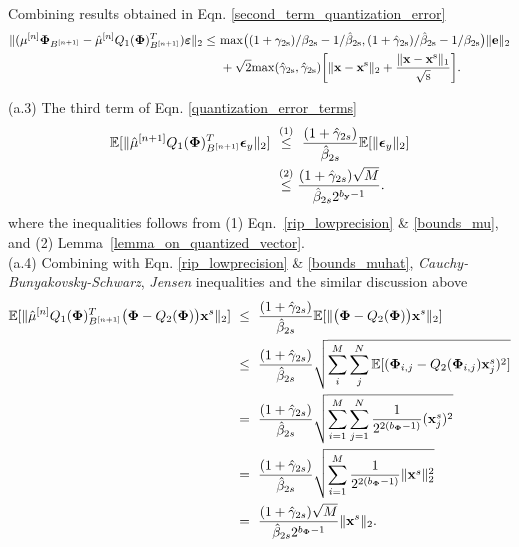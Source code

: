 \documentclass{article}
\begin{document}
Combining results obtained in Eqn. \ref{second_term_quantization_error} 
\begin{equation}\label{second_term_main_theorem}
\begin{split}
    \|(\mu^{[n]}{\bf \Phi}_{B^{[n+1]}} - \hat{\mu}^{[n]}Q_1({\bf \Phi})_{B^{[n+1]}}^T)\boldsymbol{\bf \varepsilon} \|_2 \leq & \ \rm{max}\big((1+\gamma_{2s})/\beta_{2s} - 1/\hat{\beta}_{2s}, (1+\hat{\gamma}_{2s})/\hat{\beta}_{2s} - 1/{\beta}_{2s} \big)\|{\bf e} \|_2\\
    & \ + \sqrt{2}\rm{max}(\hat{\gamma}_{2s}, \hat{\gamma}_{2s})\bigg  [ \|{\bf x}-{\bf x}^s \|_2 + \frac{\|{\bf x}-{\bf x}^s \|_1}{\sqrt{s}}\bigg].
\end{split}
\end{equation}

(a.3) The third term of Eqn. \ref{quantization_error_terms}
\begin{equation}\label{third_term_main_theorem}
    \begin{split}
         \mathbb{E}[\|\hat{\mu}^{[n+1]}Q_1({\bf \Phi})_{B^{[n+1]}}^T \boldsymbol{\epsilon}_y \|_2]& \ \stackrel{(1)}{\leq} \  \frac{(1+\hat{\gamma}_{2s})}{\hat{\beta}_{2s}}\mathbb{E}[{\|\boldsymbol{\epsilon}_y \|_2}]\\
         &\ \stackrel{(2)}{\leq}\frac{(1+\hat{\gamma}_{2s})\sqrt{M}}{\hat{\beta}_{2s}2^{b_{\bf y}-1}}.
    \end{split}
\end{equation}
where the inequalities follows from (1) Eqn.~\ref{rip_lowprecision} \& \ref{bounds_mu}, and (2) Lemma~\ref{lemma_on_quantized_vector}.\\

(a.4) Combining with Eqn. \ref{rip_lowprecision} \& \ref{bounds_muhat}, {\it Cauchy-Bunyakovsky-Schwarz}, {\it Jensen} inequalities and the similar discussion above
\begin{equation}\label{forth_term_main_theorem}
\begin{split}
    \mathbb{E}[\| \hat{\mu}^{[n]}Q_1({\bf \Phi})_{B^{[n+1]}}^T\big({\bf {\bf \Phi}}-Q_2({\bf {\bf \Phi}})\big){\bf x}^s \|_2]&\ \leq \ \frac{(1+\hat{\gamma}_{2s})}{\hat{\beta}_{2s}}\mathbb{E}[\|\big({\bf {\bf \Phi}}-Q_2({\bf {\bf \Phi}})\big){\bf x}^s \|_2]\\
    &\ \leq \ \frac{(1+\hat{\gamma}_{2s})}{\hat{\beta}_{2s}}\sqrt{
    \sum_{i}^M \sum_{j}^N\mathbb{E}[({\bf \Phi}_{i, j}-Q_2({\bf \Phi}_{i, j}){\bf x}_j^s)^2]}\\
    & \ = \ \frac{(1+\hat{\gamma}_{2s})}{\hat{\beta}_{2s}}\sqrt{\sum_{i=1}^M \sum_{j=1}^N \frac{1}{2^{2(b_{\bf \Phi}-1)}}({\bf x}_j^s)^2}\\
    & \ = \ \frac{(1+\hat{\gamma}_{2s})}{\hat{\beta}_{2s}}\sqrt{\sum_{i=1}^M \frac{1}{2^{2(b_{\bf \Phi}-1)}}\|{\bf x}^s\|_2^2}\\
    & \ = \ \frac{(1+\hat{\gamma}_{2s})\sqrt{M}}{\hat{\beta}_{2s}2^{b_{\bf \Phi}-1}}\|{\bf x}^s \|_2.
\end{split}
\end{equation}
\end{document}
